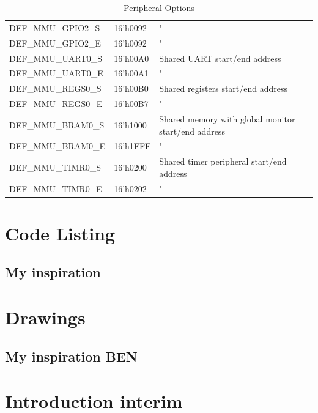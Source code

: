 \documentclass[11pt,a4paper]{report}
\begin{document}
{\begin{appendices}
\begin{table}[H]
\begin{tabular}{l|l|l}
DEF\_MMU\_GPIO2\_S & 16'h0092 & "                                                    \\
DEF\_MMU\_GPIO2\_E & 16'h0092 & "                                                    \\
DEF\_MMU\_UART0\_S & 16'h00A0 & Shared UART start/end address                        \\
DEF\_MMU\_UART0\_E & 16'h00A1 & "                                                    \\
DEF\_MMU\_REGS0\_S & 16'h00B0 & Shared registers start/end address                   \\
DEF\_MMU\_REGS0\_E & 16'h00B7 & "                                                    \\
DEF\_MMU\_BRAM0\_S & 16'h1000 & Shared memory with global monitor start/end address  \\
DEF\_MMU\_BRAM0\_E & 16'h1FFF & "                                                    \\
DEF\_MMU\_TIMR0\_S & 16'h0200 & Shared timer peripheral start/end address            \\
DEF\_MMU\_TIMR0\_E & 16'h0202 & "                                                   
\end{tabular}
\captionsetup{labelformat=empty}
\caption{Peripheral Options}
\label{tab:isa}
\end{table}

\chapter{Code Listing}
\section{My inspiration}
\chapter{Drawings}
\section{My inspiration BEN}
\end{appendices}

\newpage
\chapter{Introduction interim}
{%
\startcontents[chapters]
}

}
\end{document}
